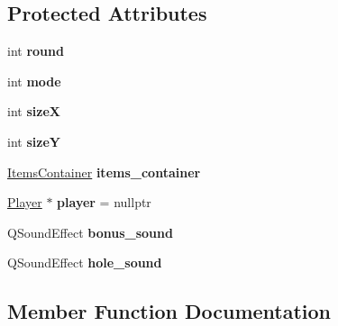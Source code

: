 \subsection*{Protected Attributes}
\begin{DoxyCompactItemize}
\item 
int {\bfseries round}\hypertarget{class_game_engine_aa28d21ca6308c68892642f112a9f576a}{}\label{class_game_engine_aa28d21ca6308c68892642f112a9f576a}

\item 
int {\bfseries mode}\hypertarget{class_game_engine_a7145ec824cc63e5323fd8f5a074ec342}{}\label{class_game_engine_a7145ec824cc63e5323fd8f5a074ec342}

\item 
int {\bfseries sizeX}\hypertarget{class_game_engine_a5b500d38dc898994a2e0f53a923fe0a5}{}\label{class_game_engine_a5b500d38dc898994a2e0f53a923fe0a5}

\item 
int {\bfseries sizeY}\hypertarget{class_game_engine_ad720d519a87110aea56f8c896de586e9}{}\label{class_game_engine_ad720d519a87110aea56f8c896de586e9}

\item 
\hyperlink{class_items_container}{Items\+Container} {\bfseries items\+\_\+container}\hypertarget{class_game_engine_a306792ba7de2bd02ac487425a449992c}{}\label{class_game_engine_a306792ba7de2bd02ac487425a449992c}

\item 
\hyperlink{class_player}{Player} $\ast$ {\bfseries player} = nullptr\hypertarget{class_game_engine_aabcb1d42f2f2a0d49abb6f010599eb78}{}\label{class_game_engine_aabcb1d42f2f2a0d49abb6f010599eb78}

\item 
Q\+Sound\+Effect {\bfseries bonus\+\_\+sound}\hypertarget{class_game_engine_a5e986b659dd5a4c57039332c7e468e99}{}\label{class_game_engine_a5e986b659dd5a4c57039332c7e468e99}

\item 
Q\+Sound\+Effect {\bfseries hole\+\_\+sound}\hypertarget{class_game_engine_a218635f0033570563613c93a94decdf6}{}\label{class_game_engine_a218635f0033570563613c93a94decdf6}

\end{DoxyCompactItemize}


\subsection{Member Function Documentation}
